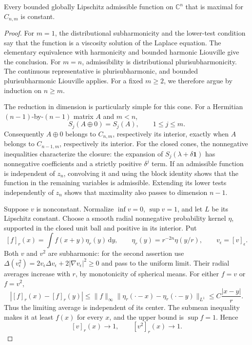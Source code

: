\begin{theorem}\label{draft:596-hessian-cone-liouville}
Every bounded globally Lipschitz admissible function on $\mathbb C^n$ that is maximal for $C_{n,m}$ is constant.
\end{theorem}
\begin{proof}
For $m=1$, the distributional subharmonicity and the lower-test condition say that the function is a viscosity solution of the Laplace equation. The elementary equivalence with harmonicity and bounded harmonic Liouville give the conclusion. For $m=n$, admissibility is distributional plurisubharmonicity. The continuous representative is plurisubharmonic, and bounded plurisubharmonic Liouville applies.
For a fixed $m\geq2$, we therefore argue by induction on $n\geq m$.

The reduction in dimension is particularly simple for this cone. For a Hermitian $(n-1)$-by-$(n-1)$ matrix $A$ and $m<n$,
\[
 S_j(A\oplus0)=S_j(A),\qquad 1\leq j\leq m.
\]
Consequently $A\oplus0$ belongs to $C_{n,m}$, respectively its interior, exactly when $A$ belongs to $C_{n-1,m}$, respectively its interior. For the closed cones, the nonnegative inequalities characterize the closure: the expansion of $S_j(\lambda+\delta\mathbf1)$ has nonnegative coefficients and a strictly positive $\delta^j$ term. If an admissible function is independent of $z_n$, convolving it and using the block identity shows that the function in the remaining variables is admissible. Extending its lower tests independently of $z_n$ shows that maximality also passes to dimension $n-1$.

Suppose $v$ is nonconstant. Normalize $\inf v=0$, $\sup v=1$, and let $L$ be its Lipschitz constant. Choose a smooth radial nonnegative probability kernel $\eta$, supported in the closed unit ball and positive in its interior. Put
\[
 [f]_r(x)=\int f(x+y)\eta_r(y)\,\mathrm dy,
 \qquad \eta_r(y)=r^{-2n}\eta(y/r),\qquad v_\epsilon=[v]_\epsilon.
\]
Both $v$ and $v^2$ are subharmonic: for the second assertion use
$\Delta(v_\epsilon^2)=2v_\epsilon\Delta v_\epsilon+2|\nabla v_\epsilon|^2\geq0$ and pass to the uniform limit.
Their radial averages increase with $r$, by monotonicity of spherical means. For either $f=v$ or $f=v^2$,
\[
 |[f]_r(x)-[f]_r(y)|
 \leq\|f\|_\infty\|\eta_r(\cdot-x)-\eta_r(\cdot-y)\|_{L^1}
 \leq C\frac{|x-y|}{r}.
\]
Thus the limiting average is independent of its center. The submean inequality makes it at least $f(x)$ for every $x$, and the upper bound is $\sup f=1$. Hence
\[
 [v]_r(x)\longrightarrow1,\qquad [v^2]_r(x)\longrightarrow1.
\]


\end{proof}
